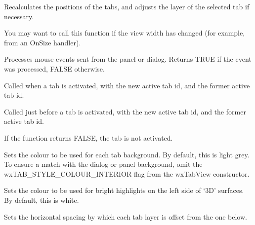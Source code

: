 Recalculates the positions of the tabs, and adjusts the layer of the selected tab if necessary.

You may want to call this function if the view width has changed (for example, from an OnSize handler).



Processes mouse events sent from the panel or dialog. Returns TRUE if the event was processed,
FALSE otherwise.



Called when a tab is activated, with the new active tab id, and the former active tab id.



Called just before a tab is activated, with the new active tab id, and the former active tab id.

If the function returns FALSE, the tab is not activated.



Sets the colour to be used for each tab background. By default, this is
light grey. To ensure a match with the dialog or panel background, omit
the wxTAB\_STYLE\_COLOUR\_INTERIOR flag from the wxTabView constructor. 



Sets the colour to be used for bright highlights on the left side of `3D' surfaces. By default, this is white.



Sets the horizontal spacing by which each tab layer is offset from the one below.




